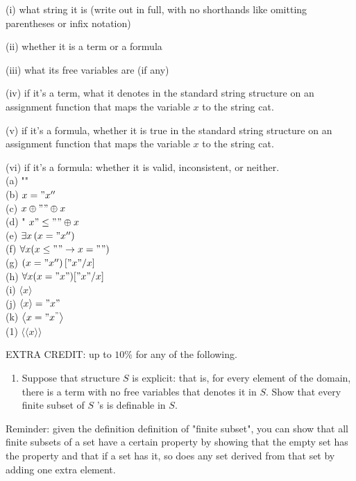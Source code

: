 \documentclass[10pt]{article}
\begin{document}
(i) what string it is (write out in full, with no shorthands like omitting parentheses or infix notation)

(ii) whether it is a term or a formula

(iii) what its free variables are (if any)

(iv) if it's a term, what it denotes in the standard string structure on an assignment function that maps the variable \(x\) to the string cat.

(v) if it's a formula, whether it is true in the standard string structure on an assignment function that maps the variable \(x\) to the string cat.

(vi) if it's a formula: whether it is valid, inconsistent, or neither.\\
(a) ""\\
(b) \(x=" x^{\prime \prime}\)\\
(c) \(x \oplus " " \oplus x\)\\
(d) " \(x " \leq " " \oplus x\)\\
(e) \(\exists x\left(x=" x^{\prime \prime}\right)\)\\
(f) \(\forall x(x \leq " " \rightarrow x=" ")\)\\
(g) \(\left(x=" x^{\prime \prime}\right)[" x " / x]\)\\
(h) \(\forall x(x=" x ")[" x " / x]\)\\
(i) \(\langle x\rangle\)\\
(j) \(\langle x\rangle=" x "\)\\
(k) \(\left\langle x=" x^{"}\right\rangle\)\\
(1) \(\langle\langle x\rangle\rangle\)

EXTRA CREDIT: up to \(10 \%\) for any of the following.

\begin{enumerate}
  \item Suppose that structure \(S\) is explicit: that is, for every element of the domain, there is a term with no free variables that denotes it in \(S\). Show that every finite subset of \(S\) 's is definable in \(S\).
\end{enumerate}

Reminder: given the definition definition of "finite subset", you can show that all finite subsets of a set have a certain property by showing that the empty set has the property and that if a set has it, so does any set derived from that set by adding one extra element.
\end{document}
